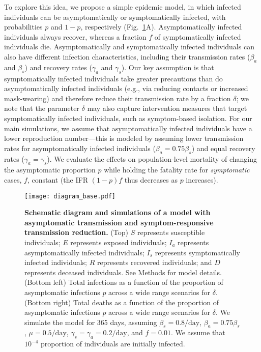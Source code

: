 \documentclass[12pt]{article}
\newcommand{\fref}[1]{Fig.~\ref{fig:#1}}
\begin{document}
To explore this idea, we propose a simple epidemic model,
in which infected individuals can be asymptomatically or symptomatically infected, with probabilities $p$ and $1-p$, respectively (\fref{base}A).  
Asymptomatically infected individuals always recover, whereas a fraction $f$ of symptomatically infected individuals die.
Asymptomatically and symptomatically infected individuals can also have different infection characteristics, including their transmission rates ($\beta_a$ and $\beta_s$) and recovery rates ($\gamma_a$ and $\gamma_s$).
Our key assumption is that symptomatically infected individuals take greater precautions than do asymptomatically infected individuals (e.g., via reducing contacts or increased mask-wearing) and therefore reduce their transmission rate by a fraction $\delta$;
we note that the parameter $\delta$ may also capture intervention measures that target symptomatically infected individuals, such as symptom-based isolation. 
For our main simulations, we assume that asymptomatically infected individuals have a lower reproduction number---this is modeled by assuming lower transmission rates for asymptomatically infected individuals ($\beta_a = 0.75 \beta_s$) and equal recovery rates ($\gamma_a = \gamma_s$).
We evaluate the effects on population-level mortality of changing the asymptomatic proportion $p$ while holding the fatality rate for \emph{symptomatic} cases, $f$, constant (the IFR $(1-p)f$ thus decreases as $p$ increases).
\begin{figure}[!ht]
\texttt{[image: diagram\_base.pdf]}
\caption{
\textbf{Schematic diagram and simulations of a model with asymptomatic transmission and symptom-responsive transmission reduction.}
(Top) $S$ represents susceptible individuals; $E$ represents exposed individuals; $I_a$ represents asymptomatically infected individuals; $I_s$ represents symptomatically infected individuals; $R$ represents recovered individuals; and $D$ represents deceased individuals. See Methods for model details.
(Bottom left) Total infections as a function of the proportion of asymptomatic infections $p$ across a wide range scenarios for $\delta$.
(Bottom right) Total deaths as a function of the proportion of asymptomatic infections $p$ across a wide range scenarios for $\delta$.
We simulate the model for 365 days, assuming $\beta_s = 0.8/\mathrm{day}$, $\beta_a = 0.75 \beta_s$, $\mu=0.5/\mathrm{day}$, $\gamma_s=\gamma_a=0.2/\mathrm{day}$, and $f=0.01$.
We assume that $10^{-4}$ proportion of individuals are initially infected.
}
\label{fig:base}
\end{figure}
\end{document}
